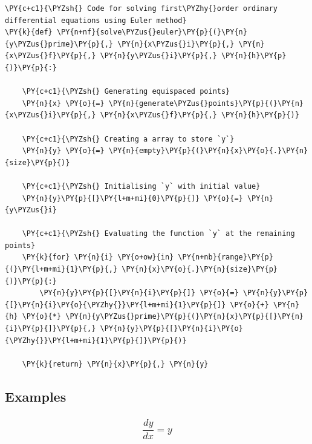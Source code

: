     \begin{tcolorbox}[breakable, size=fbox, boxrule=1pt, pad at break*=1mm,colback=cellbackground, colframe=cellborder]
\begin{Verbatim}[commandchars=\\\{\}]
\PY{c+c1}{\PYZsh{} Code for solving first\PYZhy{}order ordinary differential equations using Euler method}
\PY{k}{def} \PY{n+nf}{solve\PYZus{}euler}\PY{p}{(}\PY{n}{y\PYZus{}prime}\PY{p}{,} \PY{n}{x\PYZus{}i}\PY{p}{,} \PY{n}{x\PYZus{}f}\PY{p}{,} \PY{n}{y\PYZus{}i}\PY{p}{,} \PY{n}{h}\PY{p}{)}\PY{p}{:}

    \PY{c+c1}{\PYZsh{} Generating equispaced points}
    \PY{n}{x} \PY{o}{=} \PY{n}{generate\PYZus{}points}\PY{p}{(}\PY{n}{x\PYZus{}i}\PY{p}{,} \PY{n}{x\PYZus{}f}\PY{p}{,} \PY{n}{h}\PY{p}{)}

    \PY{c+c1}{\PYZsh{} Creating a array to store `y`}
    \PY{n}{y} \PY{o}{=} \PY{n}{empty}\PY{p}{(}\PY{n}{x}\PY{o}{.}\PY{n}{size}\PY{p}{)}

    \PY{c+c1}{\PYZsh{} Initialising `y` with initial value}
    \PY{n}{y}\PY{p}{[}\PY{l+m+mi}{0}\PY{p}{]} \PY{o}{=} \PY{n}{y\PYZus{}i}

    \PY{c+c1}{\PYZsh{} Evaluating the function `y` at the remaining points}
    \PY{k}{for} \PY{n}{i} \PY{o+ow}{in} \PY{n+nb}{range}\PY{p}{(}\PY{l+m+mi}{1}\PY{p}{,} \PY{n}{x}\PY{o}{.}\PY{n}{size}\PY{p}{)}\PY{p}{:}
        \PY{n}{y}\PY{p}{[}\PY{n}{i}\PY{p}{]} \PY{o}{=} \PY{n}{y}\PY{p}{[}\PY{n}{i}\PY{o}{\PYZhy{}}\PY{l+m+mi}{1}\PY{p}{]} \PY{o}{+} \PY{n}{h} \PY{o}{*} \PY{n}{y\PYZus{}prime}\PY{p}{(}\PY{n}{x}\PY{p}{[}\PY{n}{i}\PY{p}{]}\PY{p}{,} \PY{n}{y}\PY{p}{[}\PY{n}{i}\PY{o}{\PYZhy{}}\PY{l+m+mi}{1}\PY{p}{]}\PY{p}{)}

    \PY{k}{return} \PY{n}{x}\PY{p}{,} \PY{n}{y}
\end{Verbatim}
\end{tcolorbox}

    \hypertarget{examples}{%
\subsection{Examples}\label{examples}}

    \hypertarget{fracdydx-y}{%
\subsubsection{\texorpdfstring{\[\frac{dy}{dx} = y\]}{\textbackslash frac\{dy\}\{dx\} = y}}\label{fracdydx-y}}

